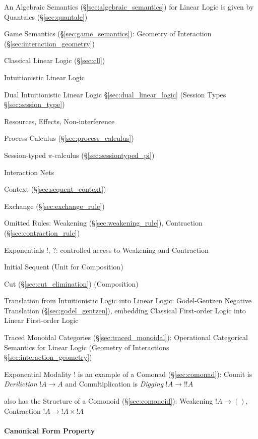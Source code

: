 An Algebraic Semantics (\S\ref{sec:algebraic_semantics}) for Linear
Logic is given by Quantales (\S\ref{sec:quantale})

Game Semantics (\S\ref{sec:game_semantics}): Geometry of Interaction
(\S\ref{sec:interaction_geometry})

Classical Linear Logic (\S\ref{sec:cll})

Intuitionistic Linear Logic

Dual Intuitionistic Linear Logic \S\ref{sec:dual_linear_logic}
(Session Types \S\ref{sec:session_type}) \cite{caires-pfenning10}

Resources, Effects, Non-interference \cite{caires-pfenning10}

Process Calculus (\S\ref{sec:process_calculus})

Session-typed $\pi$-calculus (\S\ref{sec:sessiontyped_pi})

Interaction Nets %

Context (\S\ref{sec:sequent_context})

Exchange (\S\ref{sec:exchange_rule})

Omitted Rules: Weakening (\S\ref{sec:weakening_rule}), Contraction
(\S\ref{sec:contraction_rule})

Exponentials $!$, $?$: controlled access to Weakening and Contraction

Initial Sequent (Unit for Composition)

Cut (\S\ref{sec:cut_elimination}) (Composition)

Translation from Intuitionistic Logic into Linear Logic:
G\"odel-Gentzen Negative Translation (\S\ref{sec:godel_gentzen}),
embedding Classical First-order Logic into Linear First-order Logic

Traced Monoidal Categories (\S\ref{sec:traced_monoidal}): Operational
Categorical Semantics for Linear Logic (Geometry of Interactions
\S\ref{sec:interaction_geometry})

Exponential Modality $!$ is an example of a Comonad
(\S\ref{sec:comonad}): Counit is \emph{Deriliction} $!A \rightarrow A$
and Comultiplication is \emph{Digging} $!A \rightarrow !!A$

also has the Structure of a Comonoid (\S\ref{sec:comonoid}): Weakening
$!A \rightarrow ()$, Contraction $!A \rightarrow !A \times !A$



\paragraph{Canonical Form Property}\label{sec:canonical_form_property}\hfill

